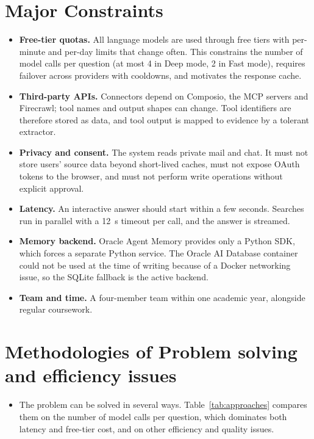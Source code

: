\section{Major Constraints}
\begin{itemize}
\item \textbf{Free-tier quotas.} All language models are used through free tiers with per-minute and per-day limits that change often. This constrains the number of model calls per question (at most 4 in Deep mode, 2 in Fast mode), requires failover across providers with cooldowns, and motivates the response cache.
\item \textbf{Third-party APIs.} Connectors depend on Composio, the MCP servers and Firecrawl; tool names and output shapes can change. Tool identifiers are therefore stored as data, and tool output is mapped to evidence by a tolerant extractor.
\item \textbf{Privacy and consent.} The system reads private mail and chat. It must not store users' source data beyond short-lived caches, must not expose OAuth tokens to the browser, and must not perform write operations without explicit approval.
\item \textbf{Latency.} An interactive answer should start within a few seconds. Searches run in parallel with a 12~s timeout per call, and the answer is streamed.
\item \textbf{Memory backend.} Oracle Agent Memory provides only a Python SDK, which forces a separate Python service. The Oracle AI Database container could not be used at the time of writing because of a Docker networking issue, so the SQLite fallback is the active backend.
\item \textbf{Team and time.} A four-member team within one academic year, alongside regular coursework.
\end{itemize}

\section{Methodologies of Problem solving and efficiency issues}
\begin{itemize}
	\item The problem can be solved in several ways. Table~\ref{tab:approaches} compares them on the number of model calls per question, which dominates both latency and free-tier cost, and on other efficiency and quality issues.
\end{itemize}

